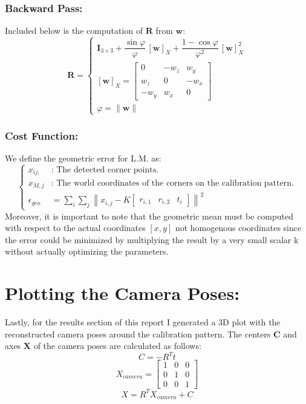\documentclass{article}
\begin{document}
\subsubsection*{Backward Pass:}
Included below is the computation of $\boldsymbol{R}$ from $\boldsymbol{w}$:
\[
    \mathbf{R} = 
    \begin{cases} 
        \mathbf{I}_{3 \times 3} + \dfrac{\sin \varphi}{\varphi} \, [\mathbf{w}]_X + \dfrac{1 - \cos \varphi}{\varphi^2} \, [\mathbf{w}]_X^2 \\[10pt]
        [\mathbf{w}]_X = \begin{bmatrix} 0 & -w_z & w_y \\ w_z & 0 & -w_x \\ -w_y & w_x & 0 \end{bmatrix} \\[10pt]
        \varphi = \|\mathbf{w}\|
    \end{cases}
\]

\subsubsection*{Cost Function:}
We define the geometric error for L.M. as:
\[\begin{cases}
    x_{ij, } & \text{: The detected corner points.} \\[7pt]
    x_{M, j} & \text{: The world coordinates of the corners on the calibration pattern.} \\[7pt]
    \epsilon_{geo} & =\sum_i \sum_j \left\|x_{i, j} - K \begin{bmatrix} r_{i, 1} & r_{i, 2} & t_i\end{bmatrix}\right\|^2
\end{cases}\]
Moreover, it is important to note that the geometric mean must be computed with respect to the actual coordinates $\left[x, y\right]$ not homogenous coordinates since the error could be minimized by multiplying the result by a very small scalar k without actually optimizing the parameters.


\section{Plotting the Camera Poses:}
Lastly, for the results section of this report I generated a 3D plot with the reconstructed camera poses around the calibration pattern. The centers $\boldsymbol{C}$ and axes $\boldsymbol{X}$ of the camera poses are calculated as follows:
\[C = - R^T t\]
\[X_{camera} = \begin{bmatrix}
    1 & 0 & 0 \\
    0 & 1 & 0 \\
    0 & 0 & 1
\end{bmatrix} \]
\[X = R^T X_{camera} + C\]
\end{document}
